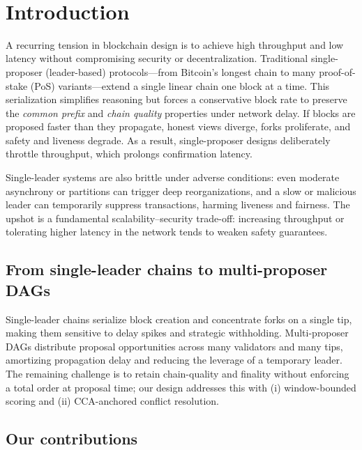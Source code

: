
\
\section{Introduction}
\label{sec:intro}


A recurring tension in blockchain design is to achieve high throughput and low latency without compromising security or decentralization. Traditional single-proposer (leader-based) protocols---from Bitcoin's longest chain to many proof-of-stake (PoS) variants---extend a single linear chain one block at a time. This serialization simplifies reasoning but forces a conservative block rate to preserve the \emph{common prefix} and \emph{chain quality} properties under network delay. If blocks are proposed faster than they propagate, honest views diverge, forks proliferate, and safety and liveness degrade. As a result, single-proposer designs deliberately throttle throughput, which prolongs confirmation latency.

Single-leader systems are also brittle under adverse conditions: even moderate asynchrony or partitions can trigger deep reorganizations, and a slow or malicious leader can temporarily suppress transactions, harming liveness and fairness. The upshot is a fundamental scalability--security trade-off: increasing throughput or tolerating higher latency in the network tends to weaken safety guarantees.

\vspace{-.3cm}

\subsection{From single-leader chains to multi-proposer DAGs}
Single-leader chains serialize block creation and concentrate forks on a single tip, making them sensitive to delay spikes and strategic withholding.
Multi-proposer DAGs distribute proposal opportunities across many validators and many tips, amortizing propagation delay and reducing the leverage of a temporary leader.
The remaining challenge is to retain chain-quality and finality without enforcing a total order at proposal time; our design addresses this with (i) window-bounded scoring and (ii) CCA-anchored conflict resolution.

\subsection{Our contributions}




